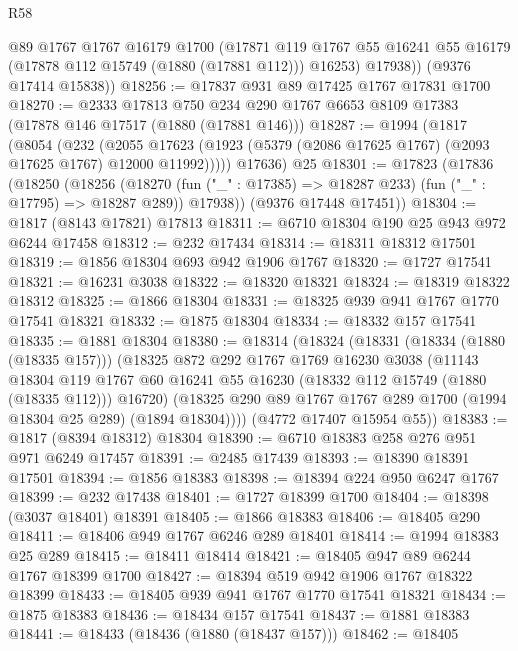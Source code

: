 \begin{lexlean}{R58}
\begin{coremodule}
          @89
          @1767
          @1767
          @16179
          @1700
          (@17871
            @119
            @1767
            @55
            @16241
            @55
            @16179
            (@17878 @112 @15749 (@1880 (@17881 @112)))
            @16253)
          @17938))
      (@9376 @17414 @15838))
@18256 := @17837 @931 @89 @17425 @1767 @17831 @1700
@18270 := @2333
    @17813
    @750
    @234
    @290
    @1767
    @6653
    @8109
    @17383
    (@17878 @146 @17517 (@1880 (@17881 @146)))
@18287 := @1994
    (@1817
      (@8054
        (@232
          (@2055 @17623 (@1923 (@5379 (@2086 @17625 @1767) (@2093 @17625 @1767) @12000 @11992)))))
      @17636)
    @25
@18301 := @17823
    (@17836
      (@18250
        (@18256
          (@18270 (fun ("_" : @17385) => @18287 @233) (fun ("_" : @17795) => @18287 @289))
          @17938))
      (@9376 @17448 @17451))
@18304 := @1817 (@8143 @17821) @17813
@18311 := @6710 @18304 @190 @25 @943 @972 @6244 @17458
@18312 := @232 @17434
@18314 := @18311 @18312 @17501
@18319 := @1856 @18304 @693 @942 @1906 @1767
@18320 := @1727 @17541
@18321 := @16231 @3038
@18322 := @18320 @18321
@18324 := @18319 @18322 @18312
@18325 := @1866 @18304
@18331 := @18325 @939 @941 @1767 @1770 @17541 @18321
@18332 := @1875 @18304
@18334 := @18332 @157 @17541
@18335 := @1881 @18304
@18380 := @18314
    (@18324
      (@18331
        (@18334 (@1880 (@18335 @157)))
        (@18325
          @872
          @292
          @1767
          @1769
          @16230
          @3038
          (@11143
            @18304
            @119
            @1767
            @60
            @16241
            @55
            @16230
            (@18332 @112 @15749 (@1880 (@18335 @112)))
            @16720)
          (@18325 @290 @89 @1767 @1767 @289 @1700 (@1994 @18304 @25 @289) (@1894 @18304))))
      (@4772 @17407 @15954 @55))
@18383 := @1817 (@8394 @18312) @18304
@18390 := @6710 @18383 @258 @276 @951 @971 @6249 @17457
@18391 := @2485 @17439
@18393 := @18390 @18391 @17501
@18394 := @1856 @18383
@18398 := @18394 @224 @950 @6247 @1767
@18399 := @232 @17438
@18401 := @1727 @18399 @1700
@18404 := @18398 (@3037 @18401) @18391
@18405 := @1866 @18383
@18406 := @18405 @290
@18411 := @18406 @949 @1767 @6246 @289 @18401
@18414 := @1994 @18383 @25 @289
@18415 := @18411 @18414
@18421 := @18405 @947 @89 @6244 @1767 @18399 @1700
@18427 := @18394 @519 @942 @1906 @1767 @18322 @18399
@18433 := @18405 @939 @941 @1767 @1770 @17541 @18321
@18434 := @1875 @18383
@18436 := @18434 @157 @17541
@18437 := @1881 @18383
@18441 := @18433 (@18436 (@1880 (@18437 @157)))
@18462 := @18405

\end{coremodule}
\end{lexlean}
